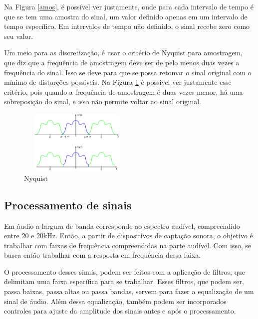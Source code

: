\documentclass[conference]{IEEEtran}
\begin{document}
Na Figura \ref{amos}, é possível ver justamente, onde para cada intervalo de tempo é que se tem uma amostra do sinal, um valor definido apenas em um intervalo de tempo específico. Em intervalos de tempo não definido, o sinal recebe zero como seu valor.

Um meio para as discretização, é usar o critério de Nyquist para amostragem, que diz que a frequência de amostragem deve ser de pelo menos duas vezes a frequência do sinal. Isso se deve para que se possa retomar o sinal original com o mínimo de distorções possíveis. 
Na Figura \ref{fig_sim} é possivel ver justamente esse critério, pois quando a frequência de amostragem é duas vezes menor, há uma sobreposição do sinal, e isso não permite voltar ao sinal original. %

\begin{figure}[!htb]
\centering
\includegraphics[width=2.2in, height = 1.2in]{Imagens/nyquist}
\caption{Nyquist}

\label{fig_sim}
\end{figure}

\subsection{Processamento de sinais}

Em áudio a largura de banda corresponde ao espectro audível, compreendido entre 20 e 20kHz. %
Então, a partir de dispositivos de captação sonora, o objetivo é trabalhar com faixas de frequência compreendidas na parte audível. Com isso, se busca então trabalhar com a resposta em frequência dessa faixa.
\cite{herrera2004projeto}

O processamento desses sinais, podem ser feitos com a aplicação de filtros, que delimitam uma faixa específica para se trabalhar. Esses filtros, que podem ser, passa baixas, passa altas ou passa bandas, servem para fazer a equalização de um sinal de áudio. Além dessa equalização, também podem ser incorporados controles para ajuste da amplitude dos sinais antes e após o processamento.
\cite{ferreira2014processamento}
\end{document}
